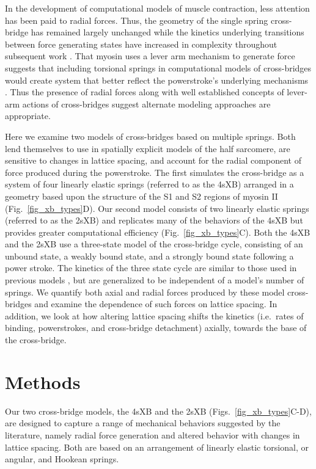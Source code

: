 \documentclass[]{article}
\begin{document}
In the development of computational models of muscle contraction, less attention has been paid to radial forces. 
Thus, the geometry of the single spring cross-bridge has remained largely unchanged while the kinetics underlying transitions between force generating states have increased in complexity throughout subsequent work \citep{Pate1989, Daniel1998, Tanner2007}.
That myosin uses a lever arm mechanism to generate force suggests that including torsional springs in computational models of cross-bridges would create system that better reflect the powerstroke's underlying mechanisms \citep{Houdusse2001}. 
Thus the presence of radial forces along with well established concepts of lever-arm actions of cross-bridges suggest alternate modeling approaches are appropriate.

Here we examine two models of cross-bridges based on multiple springs.  
Both lend themselves to use in spatially explicit models of the half sarcomere, are sensitive to changes in lattice spacing, and account for the radial component of force produced during the powerstroke. 
The first simulates the cross-bridge as a system of four linearly elastic springs (referred to as the 4sXB) arranged in a geometry based upon the structure of the S1 and S2 regions of myosin II (Fig.~\ref{fig_xb_types}D). 
Our second model consists of two linearly elastic springs (referred to as the 2sXB) and replicates many of the behaviors of the 4sXB but provides greater computational efficiency (Fig.~\ref{fig_xb_types}C). 
Both the 4sXB and the 2sXB use a three-state model of the cross-bridge cycle, consisting of an unbound state, a weakly bound state, and a strongly bound state following a power stroke. 
The kinetics of the three state cycle are similar to those used in previous models \citep{Pate1989, Daniel1998, Tanner2007}, but are generalized to be independent of a model's number of springs.
We quantify both axial and radial forces produced by these model cross-bridges and examine the dependence of such forces on lattice spacing.
In addition, we look at how altering lattice spacing shifts the kinetics (i.e.\ rates of binding, powerstrokes, and cross-bridge detachment) axially, towards the base of the cross-bridge. 


\section{Methods}  %

Our two cross-bridge models, the 4sXB and the 2sXB (Figs.~\ref{fig_xb_types}C-D), are designed to capture a range of mechanical behaviors suggested by the literature, namely radial force generation and altered behavior with changes in lattice spacing.  
Both are based on an arrangement of linearly elastic torsional, or angular, and Hookean springs.  
\end{document}
